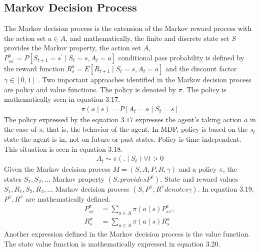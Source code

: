 \documentclass[12pt,twoside,a4]{mwbk}
\begin{document}
\subsection{Markov Decision Process}
The Markov decision process is the extension of the Markov reward process with the action set $a \in A$, and mathematically, the finite and discrete state set $S$ provides the Markov property, the action set $A$, $P_{s s^{\prime}}^ {a}=P\left[S_{t+1}=s^{\prime} \mid S_{t}=s, A_{t}=a\right]$
conditional pass probability is defined by the reward function $R_{s}^ {a}=E\left[R_{t+1} \mid S_{t}=s, A_{t}=a\right]$ and the discount factor $\gamma \in[0,1]$ . Two important approaches identified in the Markov decision process are policy and value functions. The policy is denoted by $\pi$. The policy is mathematically seen in equation 3.17.
\begin{subequations}
\begin{align}
    \pi(a \mid s)=P\left[A_{t}=a \mid S_{t}=s\right]
\end{align}
\end{subequations}
The policy expressed by the equation $3.17$ expresses the agent's taking action $a$ in the case of $s$, that is, the behavior of the agent. In MDP, policy is based on the $s_{t}$ state the agent is in, not on future or past states. Policy is time independent. This situation is seen in equation 3.18.
\begin{subequations}
\begin{align}
    A_{t} \sim \pi\left(. \mid S_{t}\right) \forall t>0
\end{align}
\end{subequations}
Given the Markov decision process $M=(S, A, P, R, \gamma)$ and a policy $\pi$, the states $S_{1}, S_{2}, \ldots$ Markov property $\left(S , provides P^{\pi}\right)$. State and reward values $S_{1}, R_{1}, S_{2}, R_{2}, \ldots$ Markov decision process $\left(S, P^{\pi}, R^{\pi } denotes \gamma\right)$. In equation 3.19, $P^{\pi}, R^{\pi}$ are mathematically defined.
\begin{subequations}
\begin{align}
    P_{s s^{\prime}}^{\pi} &=\sum_{a \in A} \pi(a \mid s) P_{s s^{\prime}}^{a}, \\
    R_{s}^{\pi} &=\sum_{a \in A} \pi(a \mid s) R_{s}^{a}
\end{align}
\end{subequations}
Another expression defined in the Markov decision process is the value function. The state value function is mathematically expressed in equation 3.20.
\end{document}
